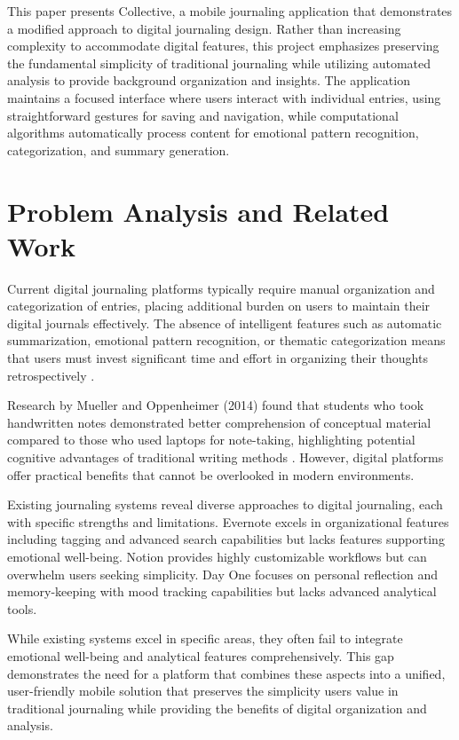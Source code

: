 \documentclass[conference]{IEEEtran}
\begin{document}
This paper presents Collective, a mobile journaling application that demonstrates a modified approach to digital journaling design. Rather than increasing complexity to accommodate digital features, this project emphasizes preserving the fundamental simplicity of traditional journaling while utilizing automated analysis to provide background organization and insights. The application maintains a focused interface where users interact with individual entries, using straightforward gestures for saving and navigation, while computational algorithms automatically process content for emotional pattern recognition, categorization, and summary generation.

\section{Problem Analysis and Related Work}

Current digital journaling platforms typically require manual organization and categorization of entries, placing additional burden on users to maintain their digital journals effectively. The absence of intelligent features such as automatic summarization, emotional pattern recognition, or thematic categorization means that users must invest significant time and effort in organizing their thoughts retrospectively \cite{baikadi2016exploring}.

Research by Mueller and Oppenheimer (2014) found that students who took handwritten notes demonstrated better comprehension of conceptual material compared to those who used laptops for note-taking, highlighting potential cognitive advantages of traditional writing methods \cite{mueller2014pen}. However, digital platforms offer practical benefits that cannot be overlooked in modern environments.

Existing journaling systems reveal diverse approaches to digital journaling, each with specific strengths and limitations. Evernote excels in organizational features including tagging and advanced search capabilities but lacks features supporting emotional well-being. Notion provides highly customizable workflows but can overwhelm users seeking simplicity. Day One focuses on personal reflection and memory-keeping with mood tracking capabilities but lacks advanced analytical tools.

While existing systems excel in specific areas, they often fail to integrate emotional well-being and analytical features comprehensively. This gap demonstrates the need for a platform that combines these aspects into a unified, user-friendly mobile solution that preserves the simplicity users value in traditional journaling while providing the benefits of digital organization and analysis.
\end{document}
